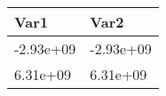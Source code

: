 \begin{tabular}{ll}
\hline 
Var1 & Var2 \\ 
\hline 
-2.93e+09 & -2.93e+09 \\ 
6.31e+09 & 6.31e+09 \\ 
\hline 
\end{tabular}